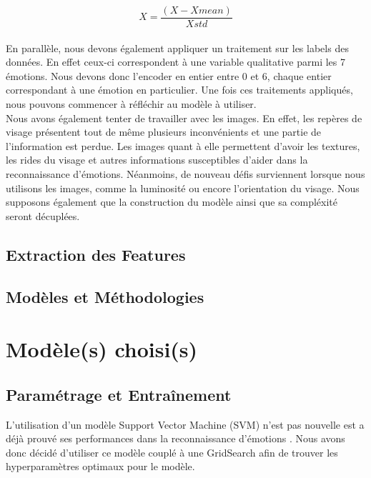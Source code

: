 \documentclass{rapport}
\begin{document}
\begin{equation}
    X = \frac{(X - Xmean)} {Xstd}
\end{equation}\\

En parallèle, nous devons également appliquer un traitement sur les labels des données.
En effet ceux-ci correspondent à une variable qualitative parmi les 7 émotions.
Nous devons donc l'encoder en entier entre 0 et 6, chaque entier correspondant à une émotion en particulier.
Une fois ces traitements appliqués, nous pouvons commencer à réfléchir au modèle à utiliser.\\

Nous avons également tenter de travailler avec les images.
En effet, les repères de visage présentent tout de même plusieurs inconvénients et une partie de l'information est perdue.
Les images quant à elle permettent d'avoir les textures,
les rides du visage et autres informations susceptibles d'aider dans la reconnaissance d'émotions.
Néanmoins, de nouveau défis surviennent lorsque nous utilisons les images, comme la luminosité ou encore l'orientation du visage.
Nous supposons également que la construction du modèle ainsi que sa compléxité seront décuplées.

\subsection{Extraction des Features}
\subsection{Modèles et Méthodologies}

\section{Modèle(s) choisi(s)}
\subsection{Paramétrage et Entraînement}

L'utilisation d'un modèle Support Vector Machine (SVM) n'est pas nouvelle est a déjà prouvé ses performances dans la reconnaissance
d'émotions \cite{kalapalaFacialExpressionRecognition2020}. Nous avons donc décidé d'utiliser ce modèle couplé à une GridSearch
afin de trouver les hyperparamètres optimaux pour le modèle.\\
\end{document}
